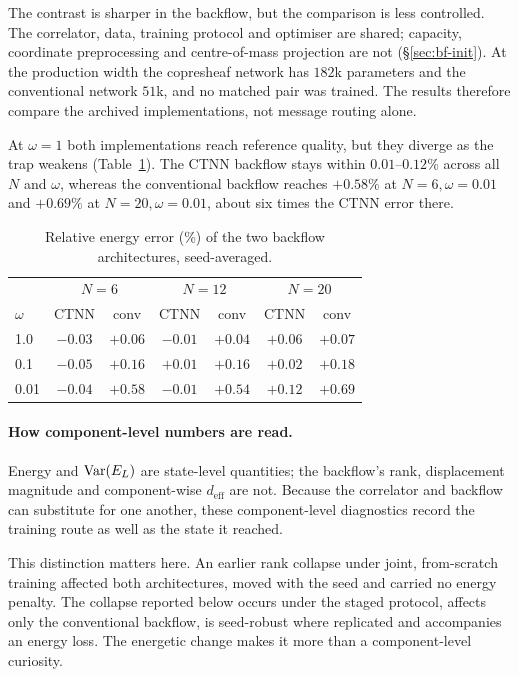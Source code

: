The contrast is sharper in the backflow, but the comparison is less controlled. The
correlator, data, training protocol and optimiser are shared; capacity, coordinate
preprocessing and centre-of-mass projection are not (\S\ref{sec:bf-init}). At the production
width the copresheaf network has $182$k parameters and the conventional network $51$k, and
no matched pair was trained. The results therefore compare the archived implementations,
not message routing alone.

At $\omega=1$ both implementations reach reference quality, but they diverge as the trap
weakens (Table~\ref{tab:bf_energies}). The CTNN backflow stays within $0.01$--$0.12\%$ across
all $N$ and $\omega$, whereas the conventional backflow reaches $+0.58\%$ at
$N=6,\omega=0.01$ and $+0.69\%$ at $N=20,\omega=0.01$, about six times the CTNN error there.

\begin{table}[htbp]\centering
\caption{Relative energy error (\%) of the two backflow architectures, seed-averaged.}
\label{tab:bf_energies}
\begin{tabular}{l|cc|cc|cc}
\hline
 & \multicolumn{2}{c|}{$N=6$} & \multicolumn{2}{c|}{$N=12$} & \multicolumn{2}{c}{$N=20$}\\
$\omega$ & CTNN & conv & CTNN & conv & CTNN & conv \\
\hline
1.0  & $-0.03$ & $+0.06$ & $-0.01$ & $+0.04$ & $+0.06$ & $+0.07$ \\
0.1  & $-0.05$ & $+0.16$ & $+0.01$ & $+0.16$ & $+0.02$ & $+0.18$ \\
0.01 & $-0.04$ & $+0.58$ & $-0.01$ & $+0.54$ & $+0.12$ & $+0.69$ \\
\hline
\end{tabular}
\end{table}

\paragraph{How component-level numbers are read.}
\label{sec:synthesis}
Energy and $\mathrm{Var}(E_L)$ are state-level quantities; the backflow's rank, displacement
magnitude and component-wise $d_{\mathrm{eff}}$ are not. Because the correlator and backflow
can substitute for one another, these component-level diagnostics record the training route
as well as the state it reached.

This distinction matters here. An earlier rank collapse under joint, from-scratch training
affected both architectures, moved with the seed and carried no energy penalty. The collapse
reported below occurs under the staged protocol, affects only the conventional backflow, is
seed-robust where replicated and accompanies an energy loss. The energetic change makes it
more than a component-level curiosity.

